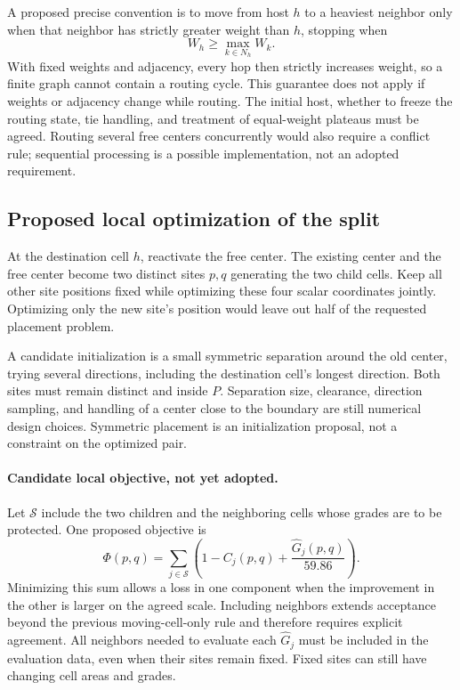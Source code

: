 A proposed precise convention is to move from host $h$ to a heaviest neighbor
only when that neighbor has strictly greater weight than $h$, stopping when
\[
 W_h\geq \max_{k\in N_h}W_k.
\]
With fixed weights and adjacency, every hop then strictly increases weight,
so a finite graph cannot contain a routing cycle. This guarantee does not
apply if weights or adjacency change while routing. The initial host, whether
to freeze the routing state, tie handling, and treatment of equal-weight
plateaus must be agreed. Routing several free centers concurrently would also
require a conflict rule; sequential processing is a possible implementation,
not an adopted requirement.

\subsection{Proposed local optimization of the split}
At the destination cell $h$, reactivate the free center. The existing center
and the free center become two distinct sites $p,q$ generating the two child
cells. Keep all other site positions fixed while optimizing these four scalar
coordinates jointly. Optimizing only the new site's position would leave out
half of the requested placement problem.

A candidate initialization is a small symmetric separation around the old
center, trying several directions, including the destination cell's longest
direction. Both sites must remain distinct and inside $P$. Separation size,
clearance, direction sampling, and handling of a center close to the boundary
are still numerical design choices. Symmetric placement is an initialization
proposal, not a constraint on the optimized pair.

\paragraph{Candidate local objective, not yet adopted.}
Let $\mathcal S$ include the two children and the neighboring cells whose
grades are to be protected. One proposed objective is
\[
 \Phi(p,q)=\sum_{j\in\mathcal S}
 \left(1-C_j(p,q)+\frac{\widehat G_j(p,q)}{59.86}\right).
\]
Minimizing this sum allows a loss in one component when the improvement in the
other is larger on the agreed scale. Including neighbors extends acceptance
beyond the previous moving-cell-only rule and therefore requires explicit
agreement. All neighbors needed to evaluate each $\widehat G_j$ must be
included in the evaluation data, even when their sites remain fixed. Fixed
sites can still have changing cell areas and grades.

